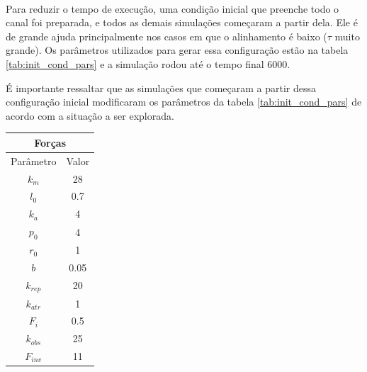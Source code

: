 \documentclass{article}
\theoremstyle{definition}
\begin{document}
\paragraph{}
Para reduzir o tempo de execução, uma condição inicial que preenche todo o canal foi preparada, e todos as demais simulações começaram a partir dela. Ele é de grande ajuda principalmente nos casos em que o alinhamento é baixo ($\tau$ muito grande). Os parâmetros utilizados para gerar essa configuração estão na tabela \ref{tab:init_cond_pars} e a simulação rodou até o tempo final $6000$. 

É importante ressaltar que as simulações que começaram a partir dessa configuração inicial modificaram os parâmetros da tabela \ref{tab:init_cond_pars} de acordo com a situação a ser explorada.

\begin{table}[h]
    \centering
    \begin{subtable}[t]{0.48\textwidth}
        \centering
        \begin{tabular}[t]{||c|c||}
        \hline
        \multicolumn{2}{|c|}{\textbf{Forças}} \\
        \hline 
        Parâmetro & Valor \\
        \hline \hline
        $k_m$ & 28 \\ \hline
        $l_0$ & 0.7 \\ \hline
        $k_a$ & 4 \\ \hline
        $p_0$ & 4 \\ \hline
        $r_0$ & 1 \\ \hline
        $b$ & 0.05 \\ \hline
        $k_{rep}$ & 20 \\ \hline
        $k_{atr}$ & 1 \\ \hline
        $F_i$ & 0.5 \\ \hline
        $k_{obs}$ & 25 \\ \hline
        $F_{inv}$ & 11 \\ \hline
        \end{tabular}
        \label{tab:init_cond_pars_force}
    \end{subtable}
    \hspace{\fill}
    \begin{subtable}[t]{0.48\textwidth}
        \begin{subtable}[t]{\textwidth}
            \centering
            \begin{tabular}[t]{||c|c||}
                 \hline

\end{tabular}
\end{subtable}
\end{subtable}
\end{table}
\end{document}
